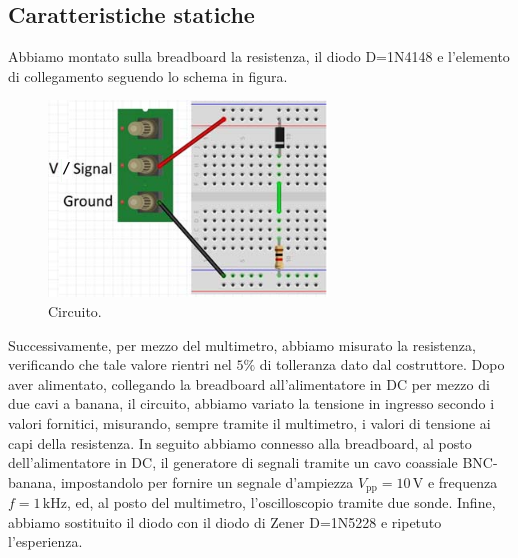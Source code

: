 \documentclass[a4paper]{article}
\begin{document}
		\subsection{Caratteristiche statiche}
			Abbiamo montato sulla breadboard la resistenza, il diodo D=1N4148 e l'elemento di collegamento seguendo lo schema in figura.
			\begin{figure}[h!]
				\centering
				\includegraphics[scale=0.7]{caratteristicheStaticheCircuito}
				\caption{Circuito.}
				\label{fig:caratteristicheStaticheCircuito}
			\end{figure}
			\newline
			Successivamente, per mezzo del multimetro, abbiamo misurato la resistenza, verificando che tale valore rientri nel $ 5 \% $ di tolleranza dato dal costruttore. Dopo aver alimentato, collegando la breadboard all'alimentatore in DC per mezzo di due cavi a banana, il circuito, abbiamo variato la tensione in ingresso secondo i valori fornitici, misurando, sempre tramite il multimetro, i valori di tensione ai capi della resistenza.
			\newline
			In seguito abbiamo connesso alla breadboard, al posto dell'alimentatore in DC, il generatore di segnali tramite un cavo coassiale BNC-banana, impostandolo per fornire un segnale d'ampiezza $ V_{\mathrm{pp}} = 10 \, \mathrm{V} $ e frequenza $ f = 1 \, \mathrm{kHz} $, ed, al posto del multimetro, l'oscilloscopio tramite due sonde.
			\newline
			Infine, abbiamo sostituito il diodo con il diodo di Zener D=1N5228 e ripetuto l'esperienza.
\end{document}

